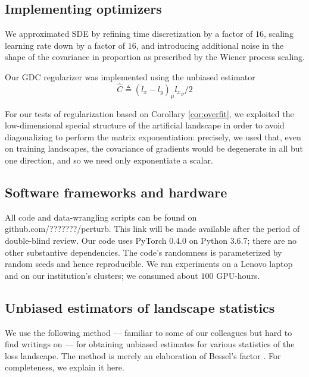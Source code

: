 \documentclass[anon,12pt]{colt2021} %
\begin{document}
    \subsection{Implementing optimizers}                            \label{appendix:optimizers}

        We approximated SDE by refining time discretization by a factor of
        $16$, scaling learning rate down by a factor of $16$, and introducing
        additional noise in the shape of the covariance in proportion as
        prescribed by the Wiener process scaling.

        Our GDC regularizer was implemented using the unbiased estimator
        $$
            \hat{C} \triangleq (l_x - l_y)_\mu {l_x}_\nu / 2
        $$
        
        For our tests of regularization based on Corollary \ref{cor:overfit},
        we exploited the low-dimensional special structure of the artificial
        landscape in order to avoid diagonalizing to perform the matrix
        exponentiation: precisely, we used that, even on training landscapes,
        the covariance of gradients would be degenerate in all but one
        direction, and so we need only exponentiate a scalar.

    \subsection{Software frameworks and hardware}                   \label{appendix:frameworks}

        All code and data-wrangling scripts can be found on
        {\color{mooteal}github.com/???????/perturb}.  This link will be made
        available after the period of double-blind review.
        Our code uses PyTorch 0.4.0 \citep{pa19} on Python 3.6.7; there are no
        other substantive dependencies.  The code's randomness is parameterized
        by random seeds and hence reproducible.
        We ran experiments on a Lenovo laptop and on our institution's
        clusters; we consumed about $100$ GPU-hours.

    \subsection{Unbiased estimators of landscape statistics}        \label{appendix:bessel}
        We use the following method --- familiar to some of our colleagues but
        hard to find writings on --- for obtaining unbiased estimates for
        various statistics of the loss landscape.  The method is merely an
        elaboration of Bessel's factor \citep{ga23}.  For completeness, we
        explain it here. 
        
\end{document}
